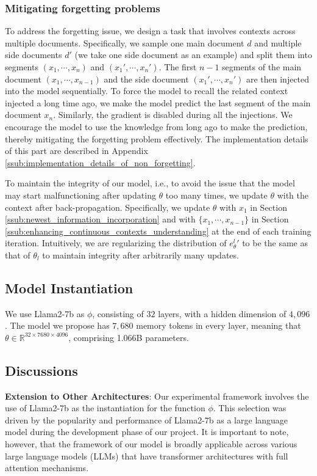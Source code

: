 \subsubsection{Mitigating forgetting problems} 
\label{ssub:mitigating_forgetting_problems}
To address the forgetting issue, we design a task that involves contexts across multiple documents. Specifically, we sample one main document $d$ and multiple side documents $d'$ (we take one side document as an example) and split them into segments $(x_1, \cdots, x_n)$ and $(x_1',\cdots, x_n')$. The first $n-1$ segments of the main document $(x_1, \cdots, x_{n-1})$ and the side document $(x_1',\cdots,x_{n}')$ are then injected into the model sequentially. To force the model to recall the related context injected a long time ago, we make the model predict the last segment of the main document ${x_n}$. Similarly, the gradient is disabled during all the injections. We encourage the model to use the knowledge from long ago to make the prediction, thereby mitigating the forgetting problem effectively. The implementation details of this part are described in Appendix \ref{ssub:implementation_details_of_non_forgetting}.

To maintain the integrity of our model, i.e., to avoid the issue that the model may start malfunctioning after updating $\theta$ too many times, we update $\theta$ with the context after back-propagation. Specifically, we update $\theta$ with $x_1$ in Section \ref{ssub:newest_information_incorporation} and with $\{x_1,\cdots,x_{n-1}\}$ in Section \ref{ssub:enhancing_continuous_contexts_understanding} at the end of each training iteration. Intuitively, we are regularizing the distribution of ${e_\theta^l}'$ to be the same as that of $\theta_l$ to maintain integrity after arbitrarily many updates.

\vspace{-5pt}
\subsection{Model Instantiation}
We use Llama2-7b as $\phi$, consisting of $32$ layers, with a hidden dimension of $4,096$. The model we propose has $7,680$ memory tokens in every layer, meaning that $\theta \in \mathbb{R}^{32 \times 7680 \times 4096}$, comprising 1.066B parameters. 

\vspace{-5pt}
\subsection{Discussions}
\textbf{Extension to Other Architectures}: Our experimental framework involves the use of Llama2-7b as the instantiation for the function $\phi$. This selection was driven by the popularity and performance of Llama2-7b as a large language model during the development phase of our project. It is important to note, however, that the framework of our model is broadly applicable across various large language models (LLMs) that have transformer architectures with full attention mechanisms. 

